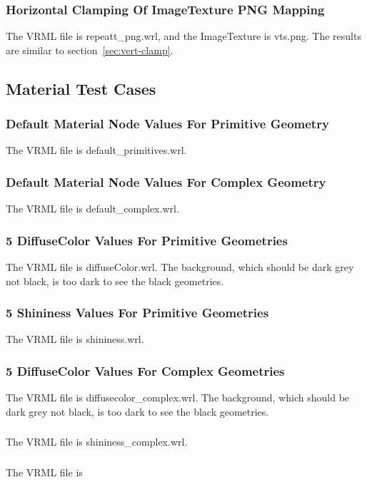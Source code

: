 \documentclass[12pt,letterpaper]{article}
\newcommand{\ITAH}{Horizontal Clamping Of ImageTexture PNG Mapping}
\newcommand{\MatA}{Default Material Node Values For Primitive Geometry}
\newcommand{\MatB}{Default Material Node Values For Complex Geometry}
\newcommand{\MatC}{5 DiffuseColor Values For Primitive Geometries}
\newcommand{\MatD}{5 Shininess Values For Primitive Geometries}
\newcommand{\MatE}{5 DiffuseColor Values For Complex Geometries}
\begin{document}
\subsubsection{\ITAH}
The VRML file is repeatt\_png.wrl, and the ImageTexture is vts.png.\newline
The results are similar to section~\ref{sec:vert-clamp}.

\subsection{Material Test Cases}

\subsubsection{\MatA}
The VRML file is default\_primitives.wrl.

\subsubsection{\MatB}
The VRML file is default\_complex.wrl.

\subsubsection{\MatC}
The VRML file is diffuseColor.wrl.\newline
The background, which should be dark grey not black, is too dark to see the black geometries.

\subsubsection{\MatD}
The VRML file is shininess.wrl.

\subsubsection{\MatE}
The VRML file is diffusecolor\_complex.wrl.\newline
The background, which should be dark grey not black, is too dark to see the black geometries.

\subsubsection{}
The VRML file is shininess\_complex.wrl.

\subsubsection{}
The VRML file is
\end{document}

